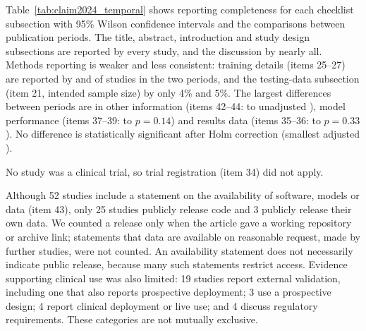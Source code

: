 

Table~\ref{tab:claim2024_temporal} shows reporting completeness for each checklist subsection with 95\% Wilson confidence intervals and the comparisons between publication periods. The title, abstract, introduction and study design subsections are reported by every study, and the discussion by nearly all. Methods reporting is weaker and less consistent: training details (items 25--27) are reported by  and  of studies in the two periods, and the testing-data subsection (item 21, intended sample size) by only 4\% and 5\%. The largest differences between periods are in other information (items 42--44:  to  unadjusted ), model performance (items 37--39:  to  $p=0.14$) and results data (items 35--36:  to  $p=0.33$). No difference is statistically significant after Holm correction (smallest adjusted ).

 No study was a clinical trial, so trial registration (item 34) did not apply.





Although 52 studies  include a statement on the availability of software, models or data (item 43), only 25 studies  publicly release code and 3  publicly release their own data. We counted a release only when the article gave a working repository or archive link; statements that data are available on reasonable request, made by  further studies, were not counted. An availability statement does not necessarily indicate public release, because many such statements restrict access. Evidence supporting clinical use was also limited: 19 studies  report external validation, including one that also reports prospective deployment; 3  use a prospective design; 4  report clinical deployment or live use; and 4  discuss regulatory requirements. These categories are not mutually exclusive.

